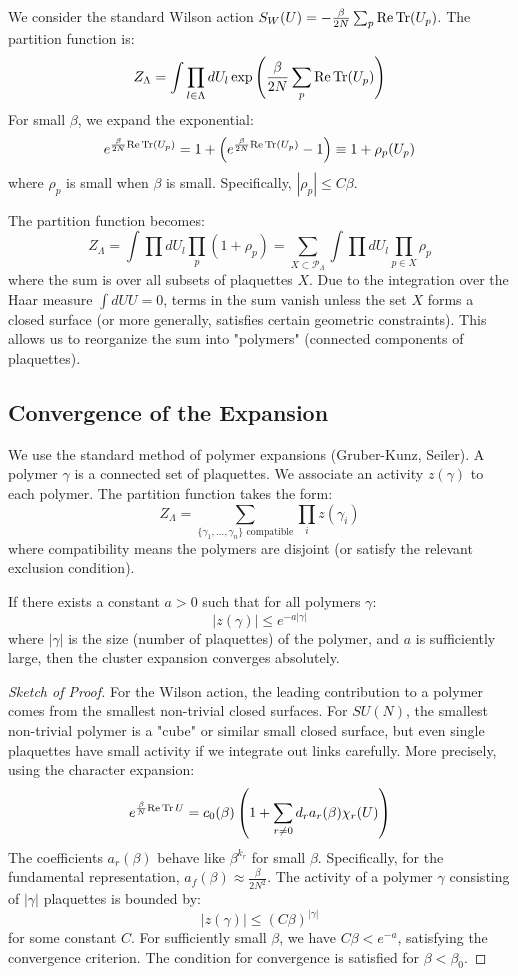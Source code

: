 We consider the standard Wilson action $S_W(U) = -\frac{\beta}{2N} \sum_p \text{Re} \operatorname{Tr}(U_p)$. The partition function is:
\[
Z_\Lambda = \int \prod_{l \in \Lambda} dU_l \exp\left( \frac{\beta}{2N} \sum_p \text{Re} \operatorname{Tr}(U_p) \right)
\]
For small $\beta$, we expand the exponential:
\[
e^{\frac{\beta}{2N} \text{Re} \operatorname{Tr}(U_p)} = 1 + \left( e^{\frac{\beta}{2N} \text{Re} \operatorname{Tr}(U_p)} - 1 \right) \equiv 1 + \rho_p(U_p)
\]
where $\rho_p$ is small when $\beta$ is small. Specifically, $|\rho_p| \le C \beta$.

The partition function becomes:
\[
Z_\Lambda = \int \prod dU_l \prod_p (1 + \rho_p) = \sum_{X \subset \mathcal{P}_\Lambda} \int \prod dU_l \prod_{p \in X} \rho_p
\]
where the sum is over all subsets of plaquettes $X$.
Due to the integration over the Haar measure $\int dU U = 0$, terms in the sum vanish unless the set $X$ forms a closed surface (or more generally, satisfies certain geometric constraints).
This allows us to reorganize the sum into "polymers" (connected components of plaquettes).

\subsection{Convergence of the Expansion}

We use the standard method of polymer expansions (Gruber-Kunz, Seiler).
A polymer $\gamma$ is a connected set of plaquettes. We associate an activity $z(\gamma)$ to each polymer.
The partition function takes the form:
\[
Z_\Lambda = \sum_{\{\gamma_1, \dots, \gamma_n\} \text{ compatible}} \prod_i z(\gamma_i)
\]
where compatibility means the polymers are disjoint (or satisfy the relevant exclusion condition).

\begin{lemma}
If there exists a constant $a > 0$ such that for all polymers $\gamma$:
\[
|z(\gamma)| \le e^{-a |\gamma|}
\]
where $|\gamma|$ is the size (number of plaquettes) of the polymer, and $a$ is sufficiently large, then the cluster expansion converges absolutely.
\end{lemma}

\begin{proof}[Sketch of Proof]
For the Wilson action, the leading contribution to a polymer comes from the smallest non-trivial closed surfaces. For $SU(N)$, the smallest non-trivial polymer is a "cube" or similar small closed surface, but even single plaquettes have small activity if we integrate out links carefully.
More precisely, using the character expansion:
\[
e^{\frac{\beta}{N} \text{Re} \operatorname{Tr} U} = c_0(\beta) \left( 1 + \sum_{r \neq 0} d_r a_r(\beta) \chi_r(U) \right)
\]
The coefficients $a_r(\beta)$ behave like $\beta^{k_r}$ for small $\beta$.
Specifically, for the fundamental representation, $a_f(\beta) \approx \frac{\beta}{2N^2}$.
The activity of a polymer $\gamma$ consisting of $|\gamma|$ plaquettes is bounded by:
\[
|z(\gamma)| \le (C \beta)^{|\gamma|}
\]
for some constant $C$.
For sufficiently small $\beta$, we have $C \beta < e^{-a}$, satisfying the convergence criterion.
The condition for convergence is satisfied for $\beta < \beta_0$.
\end{proof}

